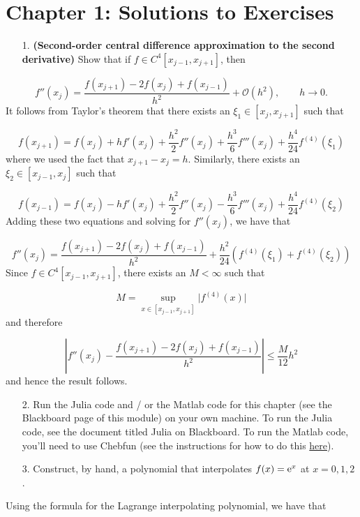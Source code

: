 \documentclass[12pt,a4paper]{article}
\begin{document}
\section{Chapter 1: Solutions to Exercises}
\begin{itemize}
\item[1. ] \textbf{(Second-order central difference approximation to the second derivative)} Show that if $f \in C^{4}[x_{j-1}, x_{j+1}]$, then

\end{itemize}
\[
f''(x_j) = \frac{f(x_{j+1}) -  2f(x_{j}) + f(x_{j-1})}{h^2} + \mathcal{O}(h^2), \qquad h \to 0.
\]
It follows from Taylor's theorem that there exists an $\xi_1 \in [x_{j},x_{j+1}]$ such that

\[
f(x_{j+1}) = f(x_{j}) + hf'(x_j) + \frac{h^2}{2}f''(x_j) +  \frac{h^3}{6}f'''(x_j)  +  \frac{h^4}{24}f^{(4)}(\xi_1)
\]
where we used the fact that  $x_{j+1} - x_j = h$. Similarly, there exists an $\xi_2 \in [x_{j-1},x_{j}]$ such that

\[
f(x_{j-1}) = f(x_{j}) - hf'(x_j) + \frac{h^2}{2}f''(x_j) -  \frac{h^3}{6}f'''(x_j)  +  \frac{h^4}{24}f^{(4)}(\xi_2)
\]
Adding these two equations and solving for $f''(x_j)$, we have that

\[
f''(x_j) = \frac{f(x_{j+1}) -  2f(x_{j}) + f(x_{j-1})}{h^2} + \frac{h^2}{24}\left(f^{(4)}(\xi_1) + f^{(4)}(\xi_2)\right)
\]
Since $f \in C^{4}[x_{j-1}, x_{j+1}]$, there exists an $M < \infty$ such that 

\[
M = \sup_{x \in [x_{j-1}, x_{j+1}]} \vert f^{(4)}(x)\vert
\]
and therefore

\[
\left\vert f''(x_j) - \frac{f(x_{j+1}) -  2f(x_{j}) + f(x_{j-1})}{h^2}\right\vert  \leq \frac{ M}{12}h^2
\]
and hence the result follows.

\begin{itemize}
\item[2. ] Run the Julia code and / or the Matlab code for this chapter (see the Blackboard page of this module) on your own machine.  To run the Julia code, see the document titled Julia on Blackboard.  To run the Matlab code, you'll need to use Chebfun (see the instructions for how to do this \href{https://www.chebfun.org/download/}{here}). 


\item[3. ] Construct, by hand, a polynomial that interpolates $f(x) = {\rm e}^{x}$ at $x = 0, 1, 2$.

\end{itemize}
Using the formula for the Lagrange interpolating polynomial, we have that
\end{document}
